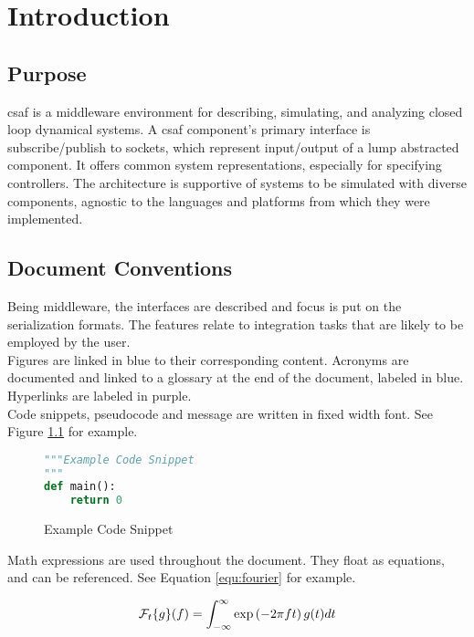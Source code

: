 \chapter{Introduction}

\section{Purpose}
\acrshort{csaf} is a middleware environment for describing, simulating, and analyzing closed loop dynamical systems. A \acrshort{csaf} component's primary interface is subscribe/publish to sockets, which represent input/output of a lump abstracted component. It offers common system representations, especially for specifying controllers. The architecture is supportive of systems to be simulated with diverse components, agnostic to the languages and platforms from which they were implemented.


\section{Document Conventions}

Being middleware, the interfaces are described and focus is put on the serialization formats. The features relate to integration tasks that are likely to be employed by the user. \\

Figures are linked in blue to their corresponding content. Acronyms are documented and linked to a glossary at the end of the document, labeled in blue. Hyperlinks are labeled in purple. \\

Code snippets, pseudocode and message are written in fixed width font. See Figure \ref{code:example} for example.

\begin{figure}[h]
\centering
\begin{lstlisting}[language=Python]
"""Example Code Snippet
"""
def main():
	return 0
\end{lstlisting}
\caption{Example Code Snippet}
\label{code:example}
\end{figure}

Math expressions are used throughout the document. They float as equations, and can be referenced. See Equation \ref{equ:fourier} for example.

\begin{equation} \label{equ:fourier}
\mathcal{F}_t\{g\}(f) = \int_{-\infty}^{\infty} \exp\left({-2\pi f t}\right) g(t) dt \\
\end{equation}


